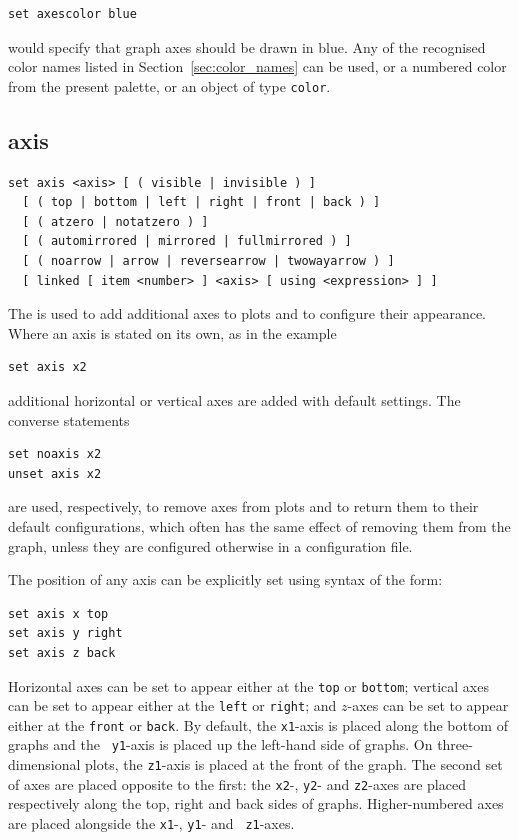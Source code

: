 \begin{verbatim}
set axescolor blue
\end{verbatim}

\noindent would specify that graph axes should be drawn in blue. Any of the
recognised color names listed in Section~\ref{sec:color_names} can be used, or a numbered color from the present palette, or an object of type {\tt color}.


\subsection{axis}

\begin{verbatim}
set axis <axis> [ ( visible | invisible ) ]
  [ ( top | bottom | left | right | front | back ) ]
  [ ( atzero | notatzero ) ]
  [ ( automirrored | mirrored | fullmirrored ) ]
  [ ( noarrow | arrow | reversearrow | twowayarrow ) ]
  [ linked [ item <number> ] <axis> [ using <expression> ] ]
\end{verbatim}

The  is used to add additional axes to plots and to
configure their appearance. Where an axis is stated on its own, as in the
example
\begin{verbatim}
set axis x2
\end{verbatim}
additional horizontal or vertical axes are added with default
settings. The converse statements
\begin{verbatim}
set noaxis x2
unset axis x2
\end{verbatim}
are used, respectively, to remove axes from plots and to return them
to their default configurations, which often has the same effect of removing
them from the graph, unless they are configured otherwise in a configuration
file.

The position of any axis can be explicitly set using syntax of the form:
\begin{verbatim}
set axis x top
set axis y right
set axis z back
\end{verbatim}
Horizontal axes can be set to appear either at the {\tt top} or {\tt bottom};
vertical axes can be set to appear either at the {\tt left} or {\tt right}; and
$z$-axes can be set to appear either at the {\tt front} or {\tt back}.  By
default, the {\tt x1}-axis is placed along the bottom of graphs and the {\tt
y1}-axis is placed up the left-hand side of graphs. On three-dimensional plots,
the {\tt z1}-axis is placed at the front of the graph. The second set of axes
are placed opposite to the first: the {\tt x2}-, {\tt y2}- and {\tt z2}-axes
are placed respectively along the top, right and back sides of graphs.
Higher-numbered axes are placed alongside the {\tt x1}-, {\tt y1}- and {\tt
z1}-axes.


